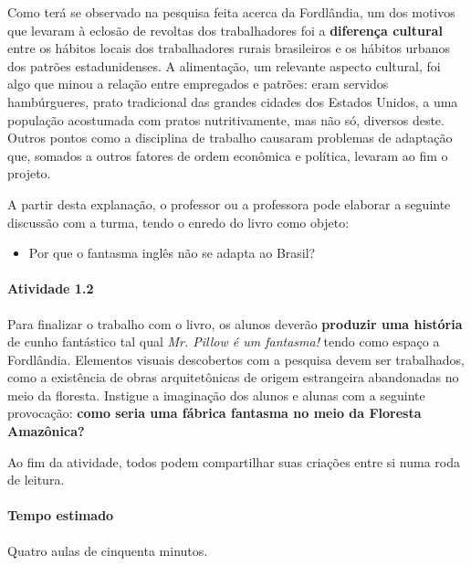 \documentclass[11pt]{extarticle}
\begin{document}

Como terá se observado na pesquisa feita acerca da Fordlândia, um dos motivos
que levaram à eclosão de revoltas dos trabalhadores foi a \textbf{diferença cultural}
entre os hábitos locais dos trabalhadores rurais brasileiros e os hábitos urbanos 
dos patrões estadunidenses. A alimentação, um relevante aspecto cultural,
foi algo que minou a relação entre empregados e patrões: eram servidos hambúrgueres, 
prato tradicional das grandes cidades dos Estados Unidos, a uma população acostumada 
com pratos nutritivamente, mas não só, diversos deste. Outros pontos como a disciplina
de trabalho causaram problemas de adaptação que, somados a outros fatores de 
ordem econômica e política, levaram ao fim o projeto.


A partir desta explanação, o professor ou a professora pode elaborar a seguinte
discussão com a turma, tendo o enredo do livro como objeto:
\begin{itemize}
\item Por que o fantasma inglês não se adapta ao Brasil?
\end{itemize}

\paragraph{Atividade 1.2}

Para finalizar o trabalho com o livro, os alunos deverão \textbf{produzir uma história}
de cunho fantástico tal qual \textit{Mr. Pillow é um fantasma!} tendo como espaço
a Fordlândia. Elementos visuais descobertos com a pesquisa devem ser trabalhados, 
como a existência de obras arquitetônicas de origem estrangeira abandonadas no meio 
da floresta.
Instigue a imaginação dos alunos e alunas com a seguinte provocação: \textbf{como seria
uma fábrica fantasma no meio da Floresta Amazônica?}

Ao fim da atividade, todos podem compartilhar suas criações entre si
numa roda de leitura. 

\paragraph{Tempo estimado} Quatro aulas de cinquenta minutos.
\end{document}
